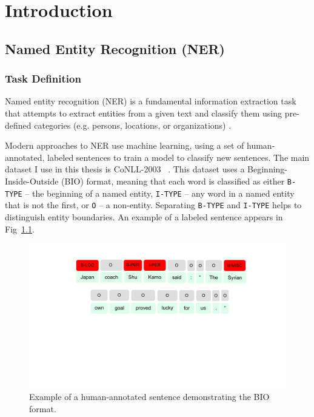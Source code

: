 \addchapheadtotoc
\chapter{Introduction}
\section{Named Entity Recognition (NER)}
\subsection{Task Definition}
\label{sec:task}
Named entity recognition (NER) is a fundamental information extraction task that attempts to extract entities from a given text and classify them using pre-defined categories (e.g. persons, locations, or organizations) \citep{2007Survey}. 

Modern approaches to NER use machine learning, using a set of human-annotated, labeled sentences to train a model to classify new sentences. The main dataset I use in this thesis is CoNLL-2003 ~\citep{conll}. This dataset uses a Beginning-Inside-Outside (BIO) format, meaning that each word is classified as either \texttt{B-TYPE} -- the beginning of a named entity, \texttt{I-TYPE} -- any word in a named entity that is not the first, or \texttt{O} -- a non-entity. Separating \texttt{B-TYPE} and \texttt{I-TYPE} helps to distinguish entity boundaries. An example of a labeled sentence appears in Fig~\ref{fig:labeledsent}.

\begin{figure}[h]
	\centering
	\includegraphics[width=0.85\linewidth]{LatexDiss/figures/labeledsent.pdf} 
	\caption{Example of a human-annotated sentence demonstrating the BIO format.}
	\label{fig:labeledsent}
\end{figure}


